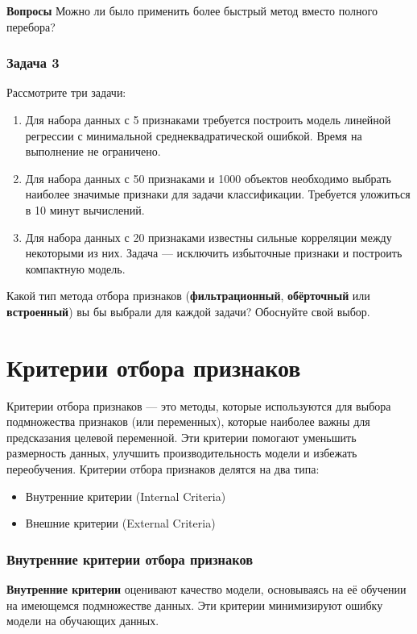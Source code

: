 \textbf{Вопросы}
 Можно ли было применить более быстрый метод вместо полного перебора?

\subsection*{Задача 3}

Рассмотрите три задачи:  
\begin{enumerate}
    \item Для набора данных с 5 признаками требуется построить модель линейной регрессии с минимальной среднеквадратической ошибкой. Время на выполнение не ограничено.  
    \item Для набора данных с 50 признаками и 1000 объектов необходимо выбрать наиболее значимые признаки для задачи классификации. Требуется уложиться в 10 минут вычислений.  
    \item Для набора данных с 20 признаками известны сильные корреляции между некоторыми из них. Задача — исключить избыточные признаки и построить компактную модель.  
\end{enumerate}

Какой тип метода отбора признаков (\textbf{фильтрационный}, \textbf{обёрточный} или \textbf{встроенный}) вы бы выбрали для каждой задачи? Обоснуйте свой выбор.

\chapter{Критерии отбора признаков}

Критерии отбора признаков — это методы, которые используются для выбора подмножества признаков (или переменных), которые наиболее важны для предсказания целевой переменной. Эти критерии помогают уменьшить размерность данных, улучшить производительность модели и избежать переобучения. Критерии отбора признаков делятся на два типа: 

\begin{itemize}
  \item Внутренние критерии (Internal Criteria)
  \item Внешние критерии (External Criteria)
\end{itemize}

\subsection{Внутренние критерии отбора признаков}

\textbf{Внутренние критерии} оценивают качество модели, основываясь на её обучении на имеющемся подмножестве данных. Эти критерии минимизируют ошибку модели на обучающих данных.

